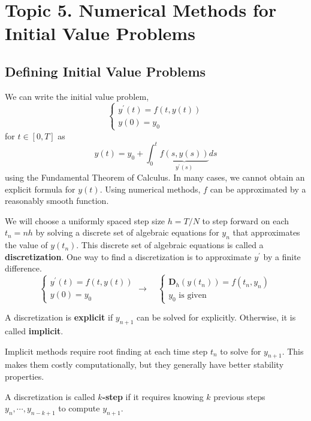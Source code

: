 \section{Topic 5. Numerical Methods for Initial Value Problems}
\subsection{Defining Initial Value Problems}
We can write the initial value problem,
\[
\begin{cases}
	y^{\prime}(t) = f(t, y(t)) \\
	y(0) = y_0
\end{cases}
\]
for $t \in [0, T]$ as
\[y(t) = y_0 + \int_0^t \underbrace{f(s, y(s))}_{y^{\prime}(s)} ds\]
using the Fundamental Theorem of Calculus. In many cases, we cannot obtain an explicit formula for  $y(t)$. Using numerical methods, $f$ can be approximated by a reasonably smooth function. 

We will choose a uniformly spaced step size $h = T / N$ to step forward on each $t_n = nh$ by solving a discrete set of algebraic equations for $y_n$ that approximates the value of $y(t_n)$. This discrete set of algebraic equations is called a \textbf{discretization}. One way to find a discretization is to approximate $y^{\prime}$ by a finite difference.
\[
\begin{cases}
	y^{\prime}(t) = f(t, y(t)) \\
	y(0) = y_0
\end{cases} \rightarrow \quad \begin{cases}
	\mathbf{D}_h (y(t_n)) = f(t_n, y_n) \\
	y_0 \text{ is given}
\end{cases}
\]

\begin{defn}
	A discretization is \textbf{explicit} if $y_{n+1}$ can be solved for explicitly. Otherwise, it is called \textbf{implicit}.
\end{defn}

\begin{rmk}
	Implicit methods require root finding at each time step $t_n$ to solve for $y_{n+1}$. This makes them costly computationally, but they generally have better stability properties.
\end{rmk}

\begin{defn}[$k$-Step]
	A discretization is called \textbf{$k$-step} if it requires knowing $k$ previous  steps $y_n, \cdots, y_{n-k+1}$ to compute $y_{n+1}$.
\end{defn}

